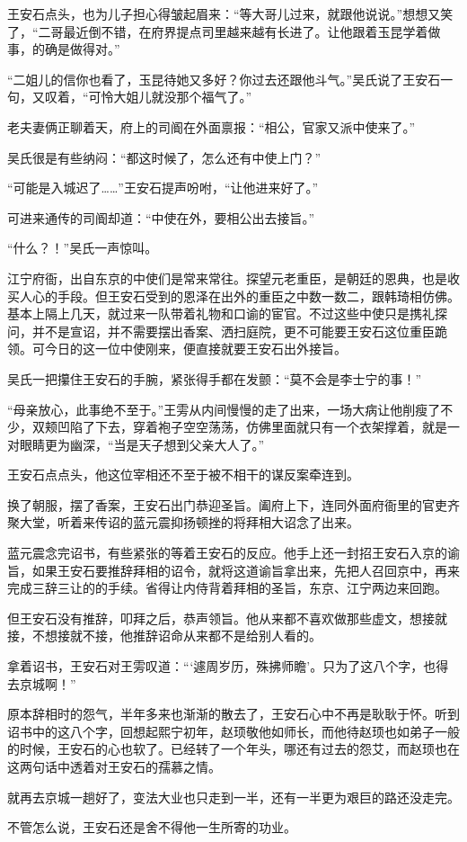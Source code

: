 王安石点头，也为儿子担心得皱起眉来：“等大哥儿过来，就跟他说说。”想想又笑了，“二哥最近倒不错，在府界提点司里越来越有长进了。让他跟着玉昆学着做事，的确是做得对。”

“二姐儿的信你也看了，玉昆待她又多好？你过去还跟他斗气。”吴氏说了王安石一句，又叹着，“可怜大姐儿就没那个福气了。”

老夫妻俩正聊着天，府上的司阍在外面禀报：“相公，官家又派中使来了。”

吴氏很是有些纳闷：“都这时候了，怎么还有中使上门？”

“可能是入城迟了……”王安石提声吩咐，“让他进来好了。”

可进来通传的司阍却道：“中使在外，要相公出去接旨。”

“什么？！”吴氏一声惊叫。

江宁府衙，出自东京的中使们是常来常往。探望元老重臣，是朝廷的恩典，也是收买人心的手段。但王安石受到的恩泽在出外的重臣之中数一数二，跟韩琦相仿佛。基本上隔上几天，就过来一队带着礼物和口谕的宦官。不过这些中使只是携礼探问，并不是宣诏，并不需要摆出香案、洒扫庭院，更不可能要王安石这位重臣跪领。可今日的这一位中使刚来，便直接就要王安石出外接旨。

吴氏一把攥住王安石的手腕，紧张得手都在发颤：“莫不会是李士宁的事！”

“母亲放心，此事绝不至于。”王雱从内间慢慢的走了出来，一场大病让他削瘦了不少，双颊凹陷了下去，穿着袍子空空荡荡，仿佛里面就只有一个衣架撑着，就是一对眼睛更为幽深，“当是天子想到父亲大人了。”

王安石点点头，他这位宰相还不至于被不相干的谋反案牵连到。

换了朝服，摆了香案，王安石出门恭迎圣旨。阖府上下，连同外面府衙里的官吏齐聚大堂，听着来传诏的蓝元震抑扬顿挫的将拜相大诏念了出来。

蓝元震念完诏书，有些紧张的等着王安石的反应。他手上还一封招王安石入京的谕旨，如果王安石要推辞拜相的诏令，就将这道谕旨拿出来，先把人召回京中，再来完成三辞三让的的手续。省得让内侍背着拜相的圣旨，东京、江宁两边来回跑。

但王安石没有推辞，叩拜之后，恭声领旨。他从来都不喜欢做那些虚文，想接就接，不想接就不接，他推辞诏命从来都不是给别人看的。

拿着诏书，王安石对王雱叹道：“‘遽周岁历，殊拂师瞻’。只为了这八个字，也得去京城啊！”

原本辞相时的怨气，半年多来也渐渐的散去了，王安石心中不再是耿耿于怀。听到诏书中的这八个字，回想起熙宁初年，赵顼敬他如师长，而他待赵顼也如弟子一般的时候，王安石的心也软了。已经转了一个年头，哪还有过去的怨艾，而赵顼也在这两句话中透着对王安石的孺慕之情。

就再去京城一趟好了，变法大业也只走到一半，还有一半更为艰巨的路还没走完。

不管怎么说，王安石还是舍不得他一生所寄的功业。

